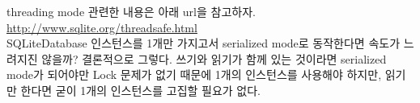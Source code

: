 threading mode 관련한 내용은 아래 url을 참고하자.\\
\url{http://www.sqlite.org/threadsafe.html}\\

SQLiteDatabase 인스턴스를 1개만 가지고서 serialized mode로 동작한다면 속도가 느려지진 않을까? 결론적으로 그렇다.
쓰기와 읽기가 함께 있는 것이라면 serialized mode가 되어야만 Lock 문제가 없기 때문에 1개의 인스턴스를 사용해야 하지만, 읽기만 한다면 굳이 1개의 인스턴스를 고집할 필요가 없다.

\begin{comment}
\subsubsection{Yield 하기}

\item Exclusive No Yielding과 Safely Contend Yield: SQLiteDatabase에는 yieldContendedSafely라는 메서드가 있어서, 다른 스레드의 명령이 실행되도록 트랜잭션을 끝내는 방법이 있다. 이게 호출될 때까지 성공한 것으로 간주하고 다시 새로운 트랜잭션이 생겨난다. 실행시간이 너무 길다 싶으면 다른 쪽에 양보를 하는 것인데, 전체 실행 속도에는 큰 차이가 보이진 않고, 다른 스레드의 명령이 너무 늦게 실행되는 것을 방지하는 측면에서 사용 가능하다. 이 테스트는 모두 다 쓰기 스레드이다.

\item No Yield Read와 Yield and Read: 쓰기 스레드와 읽기 스레드가 함께 있다. 쓰기 시간이 길어질 때 읽기 쪽에 양보하는 방식이다.
위에서 나온 Yield가 쓰일 만한 곳도 알아보자. 앱이 설치되고 처음 실행될때, 앱에서 사용할 기본 데이터를 위해서\footnote{이를테면 캘린더앱에서는 각 나라의 휴일 정보 같은 것이다. 한 해 것만 가져오는 것이 아니고 1900년부터 100년이 넘는 것을 모두 가져올 수도 있다. 음력이 있는 동양권에서는 더 많은 데이터가 필요하기도 하다.} API를 통해 서버에서 데이터를 가져올 수 있다. 만일 이것이 백만 건이 넘는 데이터라고 하면 JSON  데이터라고 해도 가져오는 데는 큰 부하까지는 걸리지 않을 것이다.\\
이것을 DB에 넣으려고 하면 당연히 Transaction으로 감싸야 한다.
그런데 앱은 처음 화면이 잘 뜨는 것도 중요하다. 
캘린더앱의 경우라면 처음 화면이 뜨고 일정을 조회하려고 DB 쿼리를 실행할 것이다. 그런데 앞에서 백만 건의 넘는 것을 Insert 하느라고 DB를 잡고 있다면, DB 쿼리를 실행할 수 없고 따라서 초기 실행 시간이 체감상 많이 느려질 수 있다.\\ 
그럼 10,000개마다 끊어서 Transaction을 매번 실행할 것인가 하면 그럴 필요가 없다. 바로 SQLiteDatabase.yieldContendedSafely를 10,000개마다 실행해주면 된다.
\end{comment}

